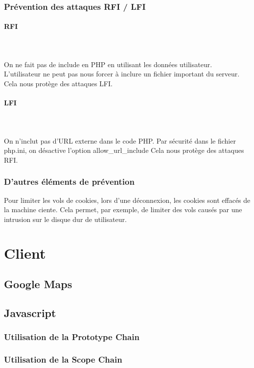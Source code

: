 \documentclass[a4paper]{article}
\begin{document}
		\subsubsection{Prévention des attaques RFI / LFI}
		
\paragraph{RFI}
~~\\
\\
On ne fait pas de include en PHP en utilisant les données utilisateur.
L'utilisateur ne peut pas nous forcer à inclure un fichier important du serveur.
Cela nous protège des attaques LFI.

\paragraph{LFI}
~~\\
\\
On n'inclut pas d'URL externe dans le code PHP.
Par sécurité dans le fichier php.ini, on désactive l'option allow\_url\_include 
Cela nous protège des attaques RFI.
		
		\subsubsection{D'autres éléments de prévention}
		
Pour limiter les vols de cookies, lors d'une déconnexion, les cookies sont effacés de la machine ciente.
Cela permet, par exemple, de limiter des vols causés par une intrusion sur le disque dur de utilisateur.
 		
\section{Client}

	\subsection{Google Maps}
	\subsection{Javascript} 
		\subsubsection{Utilisation de la Prototype Chain}
		\subsubsection{Utilisation de la Scope Chain}
\end{document}
